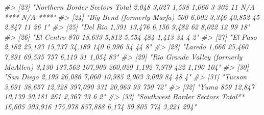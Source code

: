 \documentclass[
]{krantz}
\makeatletter
\newenvironment{Shaded}{\begin{snugshade}}{\end{snugshade}}
\newcommand{\CommentTok}[1]{\textcolor[rgb]{0.37,0.37,0.37}{\textit{#1}}}
\newenvironment{kframe}{%
\medskip{}
\setlength{\fboxsep}{.8em}
 \def\at@end@of@kframe{}%
 \ifinner\ifhmode%
  \def\at@end@of@kframe{\end{minipage}}%
  \begin{minipage}{\columnwidth}%
 \fi\fi%
 \def\FrameCommand##1{\hskip\@totalleftmargin \hskip-\fboxsep
 \colorbox{shadecolor}{##1}\hskip-\fboxsep
     \hskip-\linewidth \hskip-\@totalleftmargin \hskip\columnwidth}%
 \MakeFramed {\advance\hsize-\width
   \@totalleftmargin\z@ \linewidth\hsize
   \@setminipage}}%
 {\par\unskip\endMakeFramed%
 \at@end@of@kframe}
\renewenvironment{Shaded}{\begin{kframe}}{\end{kframe}}
\makeatother
\begin{document}
\begin{Shaded}
\begin{Highlighting}[]
\CommentTok{\#\textgreater{} [23] "Northern Border Sectors Total                    2,048             3,027                     1,538                  1,066                3               302              11        N/A ****    N/A   ****"}
\CommentTok{\#\textgreater{} [24] "Big Bend (formerly Marfa)                         500              6,002                     3,346                  40,852              45              2,847             11             26       1"       }
\CommentTok{\#\textgreater{} [25] "Del Rio                                          1,391             13,476                    6,156                  9,482               62              8,022             12             99       18"      }
\CommentTok{\#\textgreater{} [26] "El Centro                                         870              18,633                    5,812                  5,554              484              1,413             34             4        2"       }
\CommentTok{\#\textgreater{} [27] "El Paso                                          2,182             25,193                   15,337                  34,189             140              6,996             54             44       8"       }
\CommentTok{\#\textgreater{} [28] "Laredo                                           1,666             25,460                    7,891                  69,535             757              6,119             31            1,054     83"      }
\CommentTok{\#\textgreater{} [29] "Rio Grande Valley (formerly McAllen)             3,130            137,562                  107,909                 260,020            1,192             7,979            422            1,190    104"      }
\CommentTok{\#\textgreater{} [30] "San Diego                                        2,199             26,086                    7,060                  10,985            2,903             3,099             84             48       4"       }
\CommentTok{\#\textgreater{} [31] "Tucson                                           3,691             38,657                   12,328                 397,090             331             20,963             93            750       72"      }
\CommentTok{\#\textgreater{} [32] "Yuma                                              859              12,847                   10,139                  30,181             261              2,367             33             6        2"       }
\CommentTok{\#\textgreater{} [33] "Southwest Border Sectors Total**                16,605            303,916                  175,978                 857,888            6,174            59,805            774            3,221    294"      }

\end{Highlighting}
\end{Shaded}
\end{document}
